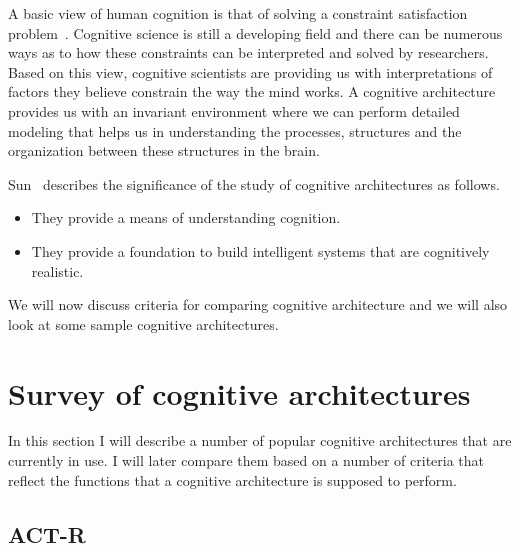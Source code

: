 A basic view of human cognition is that of solving a constraint
satisfaction problem~\cite{Newell:1990aa}.  Cognitive science is still
a developing field and there can be numerous ways as to how these
constraints can be interpreted and solved by researchers.  Based on
this view, cognitive scientists are providing us with interpretations
of factors they believe constrain the way the mind works.
%
A cognitive architecture provides us with an invariant environment
where we can perform detailed modeling that helps us in understanding
the processes, structures and the organization between these
structures in the brain\cite{journals/jetai/Sun07}.

Sun~\cite{journals/jetai/Sun07} describes the significance of the study
of cognitive architectures as follows.
\begin{itemize}
\item They provide a means of understanding cognition.
\item They provide a foundation to build intelligent systems that are
  cognitively realistic.
\end{itemize}

We will now discuss criteria for comparing cognitive architecture and
we will also look at some sample cognitive architectures.

\section{Survey of cognitive architectures}

In this section I will describe a number of popular cognitive
architectures that are currently in use. I will later compare them
based on a number of criteria that reflect the functions that a
cognitive architecture is supposed to perform.


\subsection{ACT-R}

